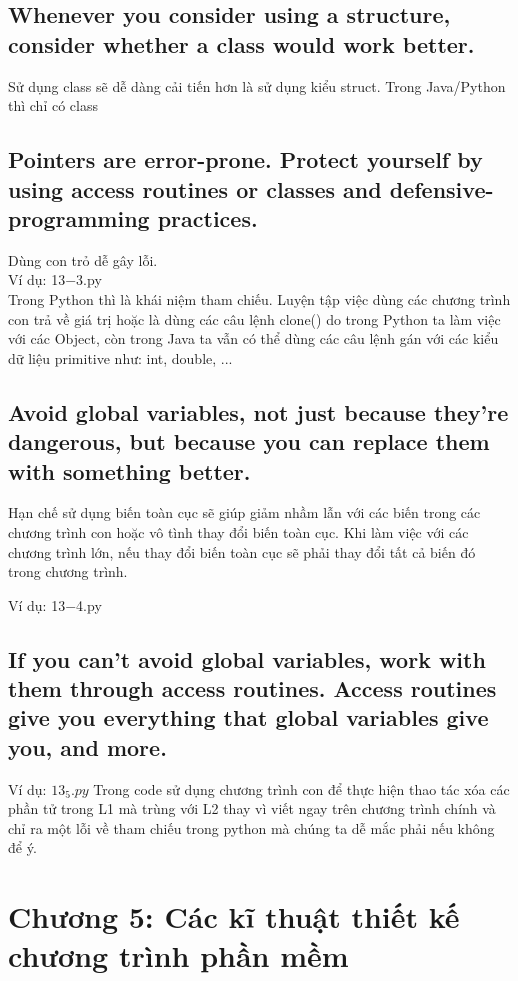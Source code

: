 \documentclass{article}
\begin{document}
    \subsection{Whenever you consider using a structure, consider whether a class would work better.}
    Sử dụng class sẽ dễ dàng cải tiến hơn là sử dụng kiểu struct. Trong Java/Python thì chỉ có class
    
    \subsection{Pointers are error-prone. Protect yourself by using access routines or classes and defensive-programming practices.}
    Dùng con trỏ dễ gây lỗi.\\
    Ví dụ: 13$-$3.py \\
    Trong Python thì là khái niệm tham chiếu. Luyện tập việc dùng các chương trình con trả về giá trị hoặc là dùng các câu lệnh clone() do trong Python ta làm việc với các Object, còn trong Java ta vẫn có thể dùng các câu lệnh gán với các kiểu dữ liệu primitive như: int, double, ...
    
    \subsection{Avoid global variables, not just because they're dangerous, but because you can replace them with something better.}
    Hạn chế sử dụng biến toàn cục sẽ giúp giảm nhầm lẫn với các biến trong các chương trình con hoặc vô tình thay đổi biến toàn cục. Khi làm việc với các chương trình lớn, nếu thay đổi biến toàn cục sẽ phải thay đổi tất cả biến đó trong chương trình.
    
    Ví dụ: 13$-$4.py
    
    \subsection{If you can't avoid global variables, work with them through access routines. Access routines give you everything that global variables give you, and more.}
    Ví dụ: $13_5.py$
    Trong code sử dụng chương trình con để thực hiện thao tác xóa các phần tử trong L1 mà trùng với L2 thay vì viết ngay trên chương trình chính và chỉ ra một lỗi về tham chiếu trong python mà chúng ta dễ mắc phải nếu không để ý.
    
\section{Chương 5: Các kĩ thuật thiết kế chương trình phần mềm}
\end{document}
